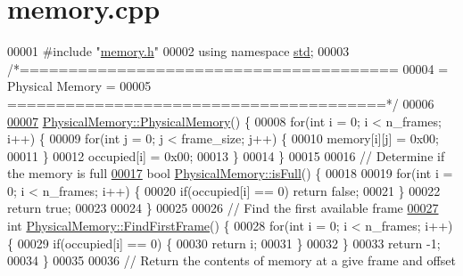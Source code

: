 \hypertarget{memory_8cpp_source}{}\section{memory.\+cpp}
\label{memory_8cpp_source}

\begin{DoxyCode}
00001 \textcolor{preprocessor}{#include "\hyperlink{memory_8h}{memory.h}"}
00002 \textcolor{keyword}{using namespace }\hyperlink{namespacestd}{std};
00003 \textcolor{comment}{/*=======================================}
00004 \textcolor{comment}{=            Physical Memory            =}
00005 \textcolor{comment}{=======================================*/}
00006 
\hypertarget{memory_8cpp_source.tex_l00007}{}\hyperlink{classPhysicalMemory_ad7fefaba61061c7339164836c6c02eaa}{00007} \hyperlink{classPhysicalMemory_ad7fefaba61061c7339164836c6c02eaa}{PhysicalMemory::PhysicalMemory}() \{
00008     \textcolor{keywordflow}{for}(\textcolor{keywordtype}{int} i = 0; i < n\_frames; i++) \{
00009         \textcolor{keywordflow}{for}(\textcolor{keywordtype}{int} j = 0; j < frame\_size; j++) \{
00010             memory[i][j] = 0x00;
00011         \}
00012         occupied[i] = 0x00;
00013     \}
00014 \}
00015 
00016 \textcolor{comment}{// Determine if the memory is full}
\hypertarget{memory_8cpp_source.tex_l00017}{}\hyperlink{classPhysicalMemory_acde26e332e20349baa6c409b88635258}{00017} \textcolor{keywordtype}{bool} \hyperlink{classPhysicalMemory_acde26e332e20349baa6c409b88635258}{PhysicalMemory::isFull}() \{
00018     
00019     \textcolor{keywordflow}{for}(\textcolor{keywordtype}{int} i = 0; i < n\_frames; i++) \{
00020         \textcolor{keywordflow}{if}(occupied[i] == 0) \textcolor{keywordflow}{return} \textcolor{keyword}{false};
00021     \}
00022     \textcolor{keywordflow}{return} \textcolor{keyword}{true};
00023 
00024 \}
00025 
00026 \textcolor{comment}{// Find the first available frame}
\hypertarget{memory_8cpp_source.tex_l00027}{}\hyperlink{classPhysicalMemory_a41ba2824ae9550b68036536d94ae8b32}{00027} \textcolor{keywordtype}{int} \hyperlink{classPhysicalMemory_a41ba2824ae9550b68036536d94ae8b32}{PhysicalMemory::FindFirstFrame}() \{
00028     \textcolor{keywordflow}{for}(\textcolor{keywordtype}{int} i = 0; i < n\_frames; i++) \{
00029         \textcolor{keywordflow}{if}(occupied[i] == 0) \{
00030             \textcolor{keywordflow}{return} i;
00031         \}
00032     \}
00033     \textcolor{keywordflow}{return} -1;
00034 \}
00035 
00036 \textcolor{comment}{// Return the contents of memory at a give frame and offset}

\end{DoxyCode}
